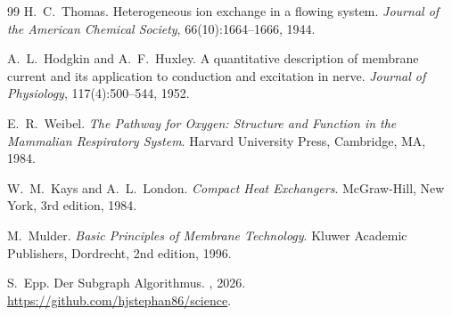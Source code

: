 ﻿\documentclass[a4paper,12pt]{article}
\theoremstyle{definition}
\begin{document}
\begin{thebibliography}{99}
H.\ C.\ Thomas.
\newblock Heterogeneous ion exchange in a flowing system.
\newblock \textit{Journal of the American Chemical Society},
         66(10):1664--1666, 1944.

A.\ L.\ Hodgkin and A.\ F.\ Huxley.
\newblock A quantitative description of membrane current and its application to
         conduction and excitation in nerve.
\newblock \textit{Journal of Physiology}, 117(4):500--544, 1952.

E.\ R.\ Weibel.
\newblock \textit{The Pathway for Oxygen: Structure and Function in the Mammalian
         Respiratory System}.
\newblock Harvard University Press, Cambridge, MA, 1984.

W.\ M.\ Kays and A.\ L.\ London.
\newblock \textit{Compact Heat Exchangers}.
\newblock McGraw-Hill, New York, 3rd edition, 1984.

M.\ Mulder.
\newblock \textit{Basic Principles of Membrane Technology}.
\newblock Kluwer Academic Publishers, Dordrecht, 2nd edition, 1996.

S.\ Epp.
\newblock Der Subgraph Algorithmus.
\newblock, 2026.
\newblock \url{https://github.com/hjstephan86/science}.

\end{thebibliography}
\end{document}
